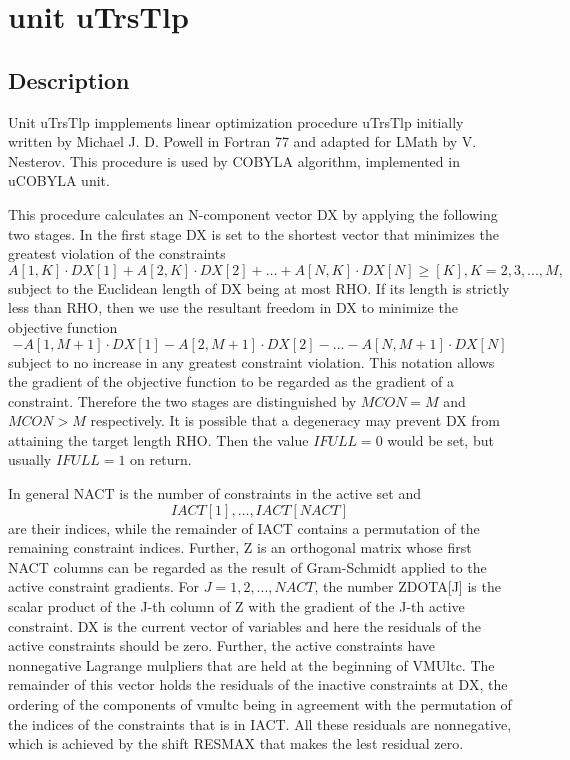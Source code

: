 \documentclass[12pt,a4paper,oneside]{report}
\begin{document}
\section{unit uTrsTlp}\label{sec:unit-utrstlp}
\subsection{Description}
Unit uTrsTlp impplements linear optimization procedure uTrsTlp initially written by Michael J. D. Powell in Fortran 77 and adapted for LMath by V. Nesterov. This procedure is used by COBYLA algorithm, implemented in uCOBYLA unit.

 This procedure calculates an N-component vector DX by applying the
following two stages. In the first stage DX is set to the shortest
vector that minimizes the greatest violation of the constraints
$$A[1,K]\cdot DX[1]+A[2,K]\cdot DX[2]+\dots+A[N,K]\cdot DX[N] \geq [K], K = 2,3,...,M,$$
subject to the Euclidean length of DX being at most RHO. If its length is
strictly less than RHO, then we use the resultant freedom in DX to
minimize the objective function
$$-A[1,M+1] \cdot DX[1]-A[2,M+1]\cdot DX[2]-\dots-A[N,M+1]\cdot DX[N]$$
subject to no increase in any greatest constraint violation. This
notation allows the gradient of the objective function to be regarded as
the gradient of a constraint. Therefore the two stages are distinguished
by $MCON = M$ and $MCON > M$ respectively. It is possible that a
degeneracy may prevent DX from attaining the target length RHO. Then the
value $IFULL = 0$ would be set, but usually $IFULL = 1$ on return.

In general NACT is the number of constraints in the active set and
$$IACT[1],\dots,IACT[NACT]$$ are their indices, while the remainder of IACT
contains a permutation of the remaining constraint indices. Further, Z is
an orthogonal matrix whose first NACT columns can be regarded as the
result of Gram-Schmidt applied to the active constraint gradients. For
$J = 1,2,...,NACT$, the number ZDOTA[J] is the scalar product of the J-th
column of Z with the gradient of the J-th active constraint. DX is the
current vector of variables and here the residuals of the active
constraints should be zero. Further, the active constraints have
nonnegative Lagrange mulpliers that are held at the beginning of
VMUltc. The remainder of this vector holds the residuals of the inactive
constraints at DX, the ordering of the components of vmultc being in
agreement with the permutation of the indices of the constraints that is
in IACT. All these residuals are nonnegative, which is achieved by the
shift RESMAX that makes the lest residual zero.
\end{document}
